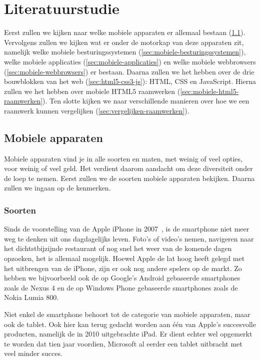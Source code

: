 \chapter{Literatuurstudie}
\label{hoofdstuk:2}
Eerst zullen we kijken naar welke mobiele apparaten er allemaal bestaan (\ref{sec:mobiele-apparaten}). Vervolgens zullen we kijken wat er onder de motorkap van deze apparaten zit, namelijk welke mobiele besturingssystemen (\ref{sec:mobiele-besturingssystemen}), welke mobiele applicaties (\ref{sec:mobiele-applicaties}) en welke mobiele webbrowsers (\ref{sec:mobiele-webbrowsers}) er bestaan. Daarna zullen we het hebben over de drie bouwblokken van het web (\ref{sec:html5-css3-js}):  HTML,  CSS en JavaScript. Hierna zullen we het hebben over mobiele HTML5 raamwerken (\ref{sec:mobiele-html5-raamwerken}).  Ten slotte kijken we naar verschillende manieren over hoe we een raamwerk kunnen vergelijken (\ref{sec:vergelijken-raamwerken}).


\section{Mobiele apparaten}
\label{sec:mobiele-apparaten}
Mobiele apparaten vind je in alle soorten en maten, met weinig of veel opties, voor weinig of veel geld. Het verdient daarom aandacht om deze diversiteit onder de loep te nemen. Eerst zullen we de soorten mobiele apparaten bekijken. Daarna zullen we ingaan op de kenmerken.

\subsection{Soorten}
Sinds de voorstelling van de Apple iPhone in 2007~\cite{David2011}, is de smartphone niet meer weg te denken uit ons dagdagelijks leven. Foto's of video's nemen, navigeren naar het dichtstbijzijnde restaurant of nog snel het weer van de komende dagen opzoeken, het is allemaal mogelijk. Hoewel Apple de lat hoog heeft gelegd met het uitbrengen van de iPhone, zijn er ook nog andere spelers op de markt. Zo hebben we bijvoorbeeld ook de op Google's Android gebaseerde smartphones zoals de Nexus 4 en de op Windows Phone gebaseerde smartphones zoals de Nokia Lumia 800.

Niet enkel de smartphone behoort tot de categorie van mobiele apparaten, maar ook de tablet. Ook hier kan terug gedacht worden aan één van Apple's succesvolle producten, namelijk de in 2010 uitgebrachte iPad. Er dient echter wel opgemerkt te worden dat tien jaar voordien, Microsoft al eerder een tablet uitbracht met veel minder succes.

